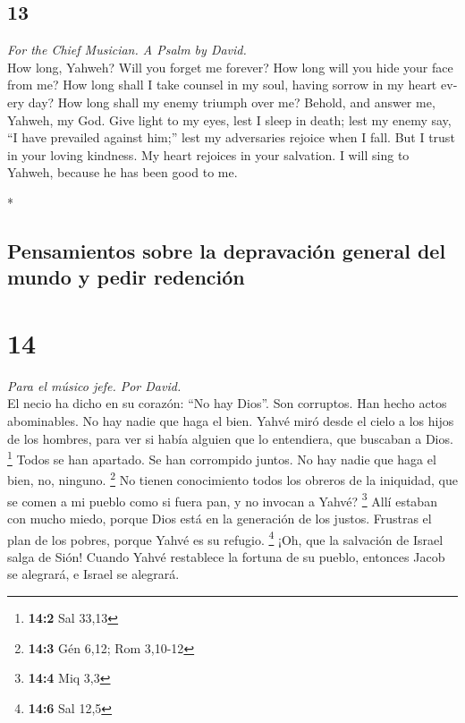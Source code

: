 \begin{paracol}{2}
\switchcolumn
\begin{otherlanguage}{english}

\hypertarget{section-25}{%
\section{13}\label{section-25}}

\emph{For the Chief Musician. A Psalm by David.}\\
 How long, Yahweh? Will you forget me forever? How long
will you hide your face from me?  How long shall I take
counsel in my soul, having sorrow in my heart every day? How long shall
my enemy triumph over me?  Behold, and answer me, Yahweh,
my God. Give light to my eyes, lest I sleep in death; 
lest my enemy say, ``I have prevailed against him;'' lest my adversaries
rejoice when I fall.  But I trust in your loving kindness.
My heart rejoices in your salvation.  I will sing to
Yahweh, because he has been good to me.

\end{otherlanguage}

\switchcolumn[0]*

\hypertarget{pensamientos-sobre-la-depravaciuxf3n-general-del-mundo-y-pedir-redenciuxf3n}{%
\subsection{Pensamientos sobre la depravación general del mundo y pedir
redención}\label{pensamientos-sobre-la-depravaciuxf3n-general-del-mundo-y-pedir-redenciuxf3n}}

\hypertarget{section-26}{%
\section{14}\label{section-26}}

\emph{Para el músico jefe. Por David.}\\
 El necio ha dicho en su corazón: ``No hay Dios''. Son
corruptos. Han hecho actos abominables. No hay nadie que haga el bien.
 Yahvé miró desde el cielo a los hijos de los hombres,
para ver si había alguien que lo entendiera, que buscaban a Dios.
\footnote{\textbf{14:2} Sal 33,13}  Todos se han apartado.
Se han corrompido juntos. No hay nadie que haga el bien, no, ninguno.
\footnote{\textbf{14:3} Gén 6,12; Rom 3,10-12}  No tienen
conocimiento todos los obreros de la iniquidad, que se comen a mi pueblo
como si fuera pan, y no invocan a Yahvé? \footnote{\textbf{14:4} Miq 3,3}
 Allí estaban con mucho miedo, porque Dios está en la
generación de los justos.  Frustras el plan de los pobres,
porque Yahvé es su refugio. \footnote{\textbf{14:6} Sal 12,5}
 ¡Oh, que la salvación de Israel salga de Sión! Cuando
Yahvé restablece la fortuna de su pueblo, entonces Jacob se alegrará, e
Israel se alegrará.


\end{paracol}
